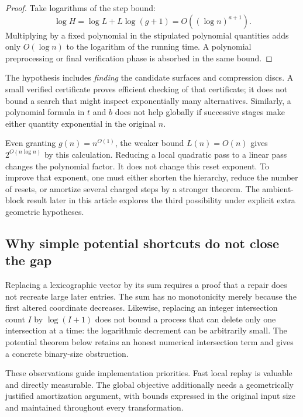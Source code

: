 \begin{proof}
Take logarithms of the step bound:
\[
 \log H=\log L+L\log(g+1)
       =O((\log n)^{a+1}).
\]
Multiplying by a fixed polynomial in the stipulated polynomial quantities
adds only $O(\log n)$ to the logarithm of the running time.  A polynomial
preprocessing or final verification phase is absorbed in the same bound.
\end{proof}

The hypothesis includes \emph{finding} the candidate surfaces and
compression discs.  A small verified certificate proves efficient checking
of that certificate; it does not bound a search that might inspect
exponentially many alternatives.  Similarly, a polynomial formula in $t$
and $b$ does not help globally if successive stages make either quantity
exponential in the original $n$.

Even granting $g(n)=n^{O(1)}$, the weaker bound $L(n)=O(n)$ gives
$2^{O(n\log n)}$ by this calculation.  Reducing a local quadratic pass to
a linear pass changes the polynomial factor.  It does not change this
reset exponent.  To improve that exponent, one must either shorten the
hierarchy, reduce the number of resets, or amortize several charged steps
by a stronger theorem.  The ambient-block result later in this article
explores the third possibility under explicit extra geometric hypotheses.

\subsection{Why simple potential shortcuts do not close the gap}

Replacing a lexicographic vector by its sum requires a proof that a repair
does not recreate large later entries.  The sum has no monotonicity merely
because the first altered coordinate decreases.  Likewise, replacing an
integer intersection count $I$ by $\log(I+1)$ does not bound a process
that can delete only one intersection at a time: the logarithmic decrement
can be arbitrarily small.  The potential theorem below retains an honest
numerical intersection term and gives a concrete binary-size obstruction.

These observations guide implementation priorities.  Fast local replay is
valuable and directly measurable.  The global objective additionally needs
a geometrically justified amortization argument, with bounds expressed in
the original input size and maintained throughout every transformation.
